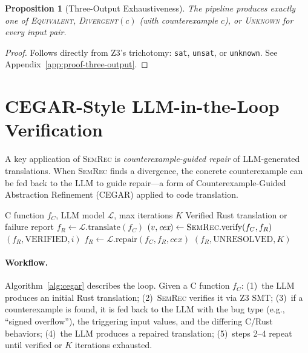 \documentclass[11pt,a4paper]{article}
\newtheorem{proposition}[theorem]{Proposition}
\begin{document}
\begin{proposition}[Three-Output Exhaustiveness]\label{thm:three-output}
The pipeline produces exactly one of \textsc{Equivalent},
\textsc{Divergent}$(c)$ (with counterexample $c$), or \textsc{Unknown}
for every input pair.
\end{proposition}
\begin{proof}
Follows directly from Z3's trichotomy: \texttt{sat}, \texttt{unsat}, or
\texttt{unknown}.  See Appendix~\ref{app:proof-three-output}.
\end{proof}


\section{CEGAR-Style LLM-in-the-Loop Verification}\label{sec:cegar}

A key application of \textsc{SemRec} is \emph{counterexample-guided
repair} of LLM-generated translations.  When \textsc{SemRec} finds a
divergence, the concrete counterexample can be fed back to the LLM
to guide repair---a form of Counterexample-Guided Abstraction Refinement
(CEGAR) applied to code translation.

\begin{algorithm}[t]
\caption{CEGAR LLM-in-the-Loop Translation Verification}\label{alg:cegar}
\begin{algorithmic}[1]
\Require C function $f_C$, LLM model $\mathcal{L}$, max iterations $K$
\Ensure Verified Rust translation or failure report
\State $f_R \gets \mathcal{L}.\text{translate}(f_C)$ 
  \State $(v, \textit{cex}) \gets \textsc{SemRec}.\text{verify}(f_C, f_R)$
    \State \Return $(f_R, \text{VERIFIED}, i)$
  \EndIf
  \State $f_R \gets \mathcal{L}.\text{repair}(f_C, f_R, \textit{cex})$ 
\EndFor
\State \Return $(f_R, \text{UNRESOLVED}, K)$
\end{algorithmic}
\end{algorithm}

\paragraph{Workflow.}
Algorithm~\ref{alg:cegar} describes the loop.  Given a C function $f_C$:
(1)~the LLM produces an initial Rust translation;
(2)~\textsc{SemRec} verifies it via Z3 SMT;
(3)~if a counterexample is found, it is fed back to the LLM with the
bug type (e.g., ``signed overflow''), the triggering input values, and
the differing C/Rust behaviors;
(4)~the LLM produces a repaired translation;
(5)~steps 2--4 repeat until verified or $K$ iterations exhausted.
\end{document}
